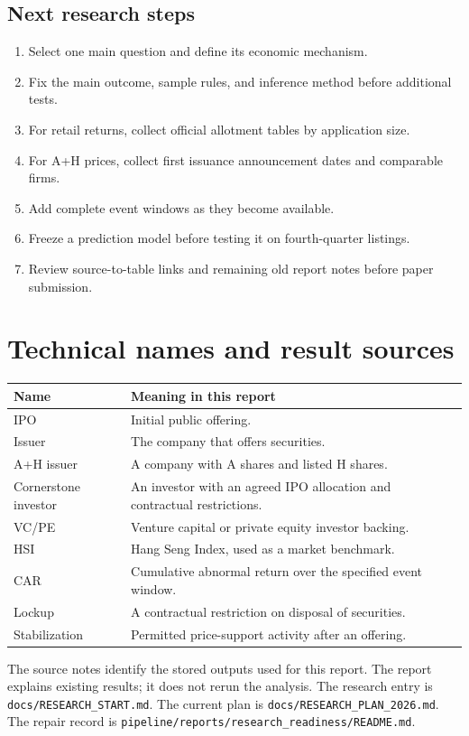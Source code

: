 \documentclass[11pt,a4paper]{article}
\begin{document}
\subsection{Next research steps}
\begin{enumerate}[nosep,leftmargin=*]
\item Select one main question and define its economic mechanism.
\item Fix the main outcome, sample rules, and inference method before additional tests.
\item For retail returns, collect official allotment tables by application size.
\item For A+H prices, collect first issuance announcement dates and comparable firms.
\item Add complete event windows as they become available.
\item Freeze a prediction model before testing it on fourth-quarter listings.
\item Review source-to-table links and remaining old report notes before paper submission.
\end{enumerate}

\section{Technical names and result sources}
\begin{tabularx}{\textwidth}{@{}lX@{}}
\toprule
Name & Meaning in this report\\
\midrule
IPO & Initial public offering.\\
Issuer & The company that offers securities.\\
A+H issuer & A company with A shares and listed H shares.\\
Cornerstone investor & An investor with an agreed IPO allocation and contractual restrictions.\\
VC/PE & Venture capital or private equity investor backing.\\
HSI & Hang Seng Index, used as a market benchmark.\\
CAR & Cumulative abnormal return over the specified event window.\\
Lockup & A contractual restriction on disposal of securities.\\
Stabilization & Permitted price-support activity after an offering.\\
\bottomrule
\end{tabularx}

The source notes identify the stored outputs used for this report.
The report explains existing results; it does not rerun the analysis.
The research entry is \nolinkurl{docs/RESEARCH_START.md}.
The current plan is \nolinkurl{docs/RESEARCH_PLAN_2026.md}.
The repair record is \nolinkurl{pipeline/reports/research_readiness/README.md}.
\end{document}
